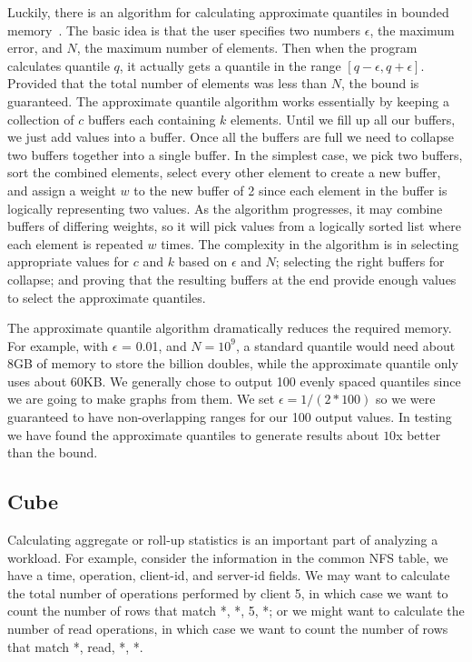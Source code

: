 Luckily, there is an algorithm for calculating approximate quantiles
in bounded memory~\cite{Manku98approximatemedians}.  The basic idea is
that the user specifies two numbers $\epsilon$, the maximum error, and
$N$, the maximum number of elements.  Then when the program calculates
quantile $q$, it actually gets a quantile in the range
$[q-\epsilon,q+\epsilon]$.  Provided that the total number of elements
was less than $N$, the bound is guaranteed.  The approximate quantile
algorithm works essentially by keeping a collection of $c$ buffers
each containing $k$ elements.  Until we fill up all our buffers, we
just add values into a buffer.  Once all the buffers are full we need
to collapse two buffers together into a single buffer.  In the
simplest case, we pick two buffers, sort the combined elements, select
every other element to create a new buffer, and assign a weight $w$ to
the new buffer of 2 since each element in the buffer is logically
representing two values.  As the algorithm progresses, it may combine
buffers of differing weights, so it will pick values from a logically
sorted list where each element is repeated $w$ times.  The complexity
in the algorithm is in selecting appropriate values for $c$ and $k$
based on $\epsilon$ and $N$; selecting the right buffers for collapse;
and proving that the resulting buffers at the end provide enough
values to select the approximate quantiles.

The approximate quantile algorithm dramatically reduces the required
memory.  For example, with $\epsilon$ = 0.01, and $N = 10^9$, a
standard quantile would need about 8GB of memory to store the billion
doubles, while the approximate quantile only uses about 60KB.  We
generally chose to output 100 evenly spaced quantiles since we are
going to make graphs from them.  We set $\epsilon = 1/(2*100)$ so we
were guaranteed to have non-overlapping ranges for our 100 output
values.  In testing we have found the approximate quantiles to
generate results about $10$x better than the bound.

\subsection{Cube}

Calculating aggregate or roll-up statistics is an important part of
analyzing a workload.  For example, consider the information in the
common NFS table, we have a time, operation, client-id, and server-id
fields.  We may want to calculate the total number of operations
performed by client 5, in which case we want to count the number of
rows that match *, *, 5, *; or we might want to calculate the number
of read operations, in which case we want to count the number of rows
that match *, read, *, *.  

